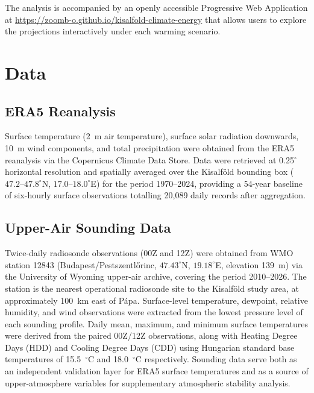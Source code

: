 \documentclass[11pt,a4paper]{article}
\begin{document}
The analysis is accompanied by an openly accessible Progressive Web
Application at \url{https://zoomb-o.github.io/kisalfold-climate-energy}
that allows users to explore the projections interactively under each
warming scenario.

\section{Data}
\label{sec:data}

\subsection{ERA5 Reanalysis}
\label{sec:data_era5}

Surface temperature (2~m air temperature), surface solar radiation
downwards, 10~m wind components, and total precipitation were obtained
from the ERA5 reanalysis \citep{hersbach2020era5} via the Copernicus
Climate Data Store. Data were retrieved at 0.25$^\circ$ horizontal
resolution and spatially averaged over the Kisalf\"{o}ld bounding box
($47.2$--$47.8^\circ$N, $17.0$--$18.0^\circ$E) for the period
1970--2024, providing a 54-year baseline of six-hourly surface
observations totalling 20,089 daily records after aggregation.

\subsection{Upper-Air Sounding Data}
\label{sec:data_soundings}

Twice-daily radiosonde observations (00Z and 12Z) were obtained from
WMO station 12843 (Budapest/Pestszentl\H{o}rinc, $47.43^\circ$N,
$19.18^\circ$E, elevation 139~m) via the University of Wyoming
upper-air archive, covering the period 2010--2026. The station is
the nearest operational radiosonde site to the Kisalf\"{o}ld study
area, at approximately 100~km east of P\'{a}pa. Surface-level
temperature, dewpoint, relative humidity, and wind observations were
extracted from the lowest pressure level of each sounding profile.
Daily mean, maximum, and minimum surface temperatures were derived
from the paired 00Z/12Z observations, along with Heating Degree Days
(HDD) and Cooling Degree Days (CDD) using Hungarian standard base
temperatures of 15.5~$^\circ$C and 18.0~$^\circ$C respectively.
Sounding data serve both as an independent validation layer for ERA5
surface temperatures and as a source of upper-atmosphere variables
for supplementary atmospheric stability analysis.
\end{document}
